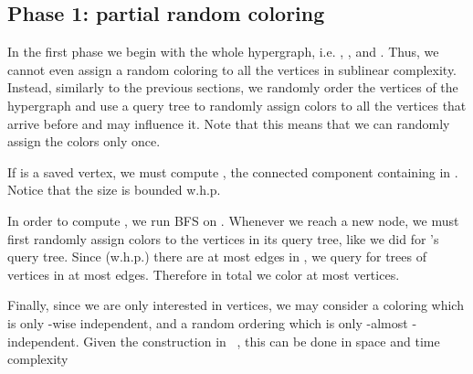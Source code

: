 \documentclass[english, oribibl]{llncs}
\begin{document}
\subsection{Phase 1: partial random coloring}
In the first phase we begin with the whole hypergraph, i.e. , , and . 
Thus, we cannot even assign a random coloring to all the vertices in sublinear complexity.
Instead, similarly to the previous sections, we randomly order the vertices of the hypergraph and use a query tree
to randomly assign colors to all the vertices that arrive before  and may influence it.
Note that this means that we can randomly assign the colors only once.

If  is a saved vertex, we must compute , 
the connected component containing  in .
Notice that the size  is bounded w.h.p.


In order to compute , we run BFS on .
Whenever we reach a new node, we must first randomly assign colors to the vertices in its query tree,
like we did for 's query tree.
Since (w.h.p.) there are at most  edges in , we query for trees of vertices in at most  edges.
Therefore in total we color at most  vertices.

Finally, since we are only interested in  vertices,
we may consider a coloring which is only -wise independent,
and a random ordering which is only -almost -independent.
Given the construction in ~\cite{ARV+11}, this can be done in space and time complexity 
\end{document}
